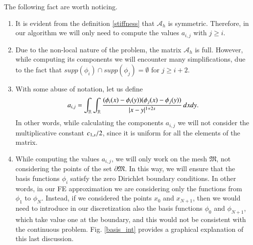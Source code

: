 \begin{remark}\label{rem_prel}
The following fact are worth noticing.
\begin{enumerate}
	\item It is evident from the definition \eqref{stiffness} that $\mathcal A_h$ is symmetric. Therefore, in our algorithm we will only need to compute the values $a_{i,j}$ with $j\geq i$.
	
	\item Due to the non-local nature of the problem, the matrix $\mathcal A_h$ is full. However, while computing its components we will encounter many simplifications, due to the fact that $supp(\phi_i)\cap supp(\phi_j) =\emptyset$ for $j\geq i+2$.
	
	\item With some abuse of notation, let us define 
	\begin{align}\label{stiffness_nc}
	a_{i,j}= \int_{\mathbb{R}}\int_{\mathbb{R}}\frac{(\phi_i(x)-\phi_i(y))(\phi_j(x)-\phi_j(y))}{|x-y|^{1+2s}}\,dxdy.
\end{align}
	In other words, while calculating the components $a_{i,j}$ we will not consider the multiplicative constant $c_{1,s}/2$, since it is uniform for all the elements of the matrix. 
	
	\item While computing the values $a_{i,j}$, we will only work on the mesh $\mathfrak{M}$, not considering the points of the set $\partial\mathfrak{M}$. In this way, we will ensure that the basis functions $\phi_i$ satisfy the zero Dirichlet boundary conditions. In other words, in our FE approximation we are considering only the functions from $\phi_1$ to $\phi_N$. Instead, if we considered the points $x_0$ and $x_{N+1}$, then we would need to introduce in our discretization also the basis functions $\phi_0$ and $\phi_{N+1}$, which take value one at the boundary, and this would not be consistent with the continuous problem. Fig. \ref{basis_int} provides a graphical explanation of this last discussion.      	
\end{enumerate}
\end{remark}

